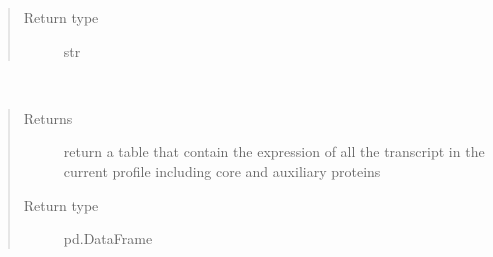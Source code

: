 \documentclass[letterpaper,10pt,english]{sphinxmanual}
\begin{document}
\begin{fulllineitems}
\begin{fulllineitems}
\begin{quote}
\begin{description}
\item[{Return type}] \leavevmode
str

\end{description}\end{quote}

\end{fulllineitems}


\begin{fulllineitems}
\label{\detokenize{IPTK.Classes:IPTK.Classes.Tissue.ExpressionProfile.get_table}}~\begin{quote}\begin{description}
\item[{Returns}] \leavevmode
return a table that contain the expression of all the transcript in the current profile                including core and auxiliary proteins

\item[{Return type}] \leavevmode
pd.DataFrame

\end{description}\end{quote}

\end{fulllineitems}


\end{fulllineitems}

\end{document}

